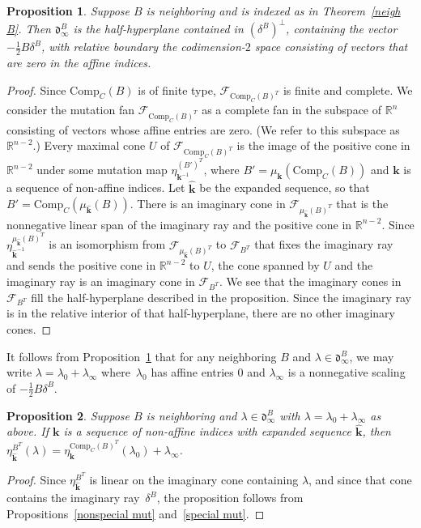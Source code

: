 \documentclass{amsart}
\newtheorem{proposition}{Proposition}[section]
\theoremstyle{definition}
\theoremstyle{remark}
\numberwithin{equation}{section}
\newcommand{\reals}{\mathbb R}
\newcommand{\F}{{\mathcal F}}
\newcommand{\0}{{\mathbf{0}}}
\newcommand{\Comp}{\mathrm{Comp}_C}
\newcommand{\kk}{{\boldsymbol{k}}}
\renewcommand{\d}{{\mathfrak d}}
\begin{document}
\begin{proposition}\label{neigh im wall}
Suppose $B$ is neighboring and is indexed as in Theorem~\ref{neigh B}.
Then $\d^B_\infty$ is the half-hyperplane contained in $(\delta^B)^\perp$, containing the vector $-\frac12B\delta^B$, with relative boundary the codimension-$2$ space consisting of vectors that are zero in the affine indices.
\end{proposition}
\begin{proof}
Since $\Comp(B)$ is of finite type, $\F_{\Comp(B)^T}$ is finite and complete.
We consider the mutation fan $\F_{\Comp(B)^T}$ as a complete fan in the subspace of $\reals^n$ consisting of vectors whose affine entries are zero. 
(We refer to this subspace as $\reals^{n-2}$.)
Every maximal cone $U$ of $\F_{\Comp(B)^T}$ is the image of the positive cone in $\reals^{n-2}$ under some mutation map $\eta^{(B')^T}_{\kk^{-1}}$, where $B'=\mu_\kk(\Comp(B))$ and $\kk$ is a sequence of non-affine indices.  
Let $\widehat\kk$ be the expanded sequence, so that $B'=\Comp(\mu_{\widehat\kk}(B))$.
There is an imaginary cone in $\F_{\mu_{\widehat\kk}(B)^T}$ that is the nonnegative linear span of the imaginary ray and the positive cone in $\reals^{n-2}$.
Since $\eta^{\mu_{\widehat\kk}(B)^T}_{\widehat\kk^{-1}}$ is an isomorphism from $\F_{\mu_{\widehat\kk}(B)^T}$ to $\F_{B^T}$ that fixes the imaginary ray and sends the positive cone in $\reals^{n-2}$ to $U$, the cone spanned by $U$ and the imaginary ray is an imaginary cone in $\F_{B^T}$.
We see that the imaginary cones in $\F_{B^T}$ fill the half-hyperplane described in the proposition.
Since the imaginary ray is in the relative interior of that half-hyperplane, there are no other imaginary cones.
\end{proof}

It follows from Proposition~\ref{neigh im wall} that for any neighboring $B$ and $\lambda\in\d_\infty^B$, we may write $\lambda=\lambda_0+\lambda_\infty$ where~$\lambda_0$ has affine entries $0$ and $\lambda_\infty$ is a nonnegative scaling of $-\frac12B\delta^B$.

\begin{proposition}\label{factor eta}
  Suppose $B$ is neighboring and $\lambda\in\d_\infty^B$ with $\lambda=\lambda_0+\lambda_\infty$ as above.
If $\kk$ is a sequence of non-affine indices with expanded sequence $\widehat\kk$, then ${\eta^{B^T}_{\widehat\kk}(\lambda)=\eta_\kk^{\Comp(B)^T}(\lambda_0)+\lambda_\infty}$.
\end{proposition}
\begin{proof}
Since $\eta_{\widehat\kk}^{B^T}$ is linear on the imaginary cone containing $\lambda$, and since that cone contains the imaginary ray~$\delta^B$, the proposition follows from Propositions~\ref{nonspecial mut} and~\ref{special mut}.
\end{proof}
\end{document}
